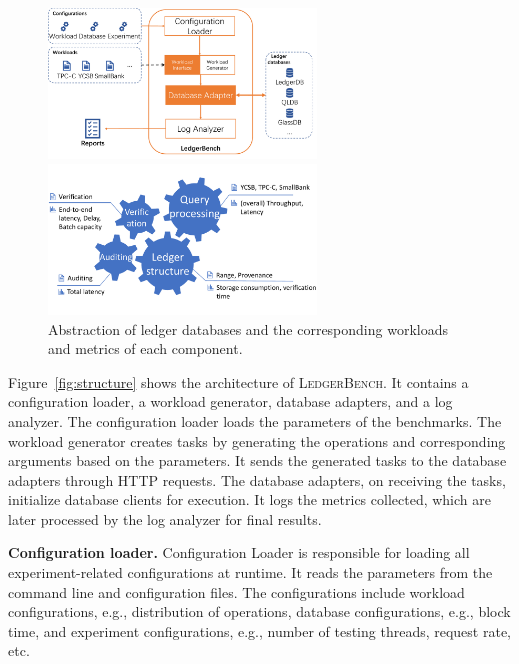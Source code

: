 \documentclass[11pt,dvipdfm]{article}
\newcommand{\systemname}{\textsc{LedgerBench}\xspace}
\begin{document}
\begin{figure}
    \centering
    \begin{minipage}{0.48\textwidth}
        \centering
        \includegraphics[height=4cm]{figs/arch_ledgerbench_fullsize.pdf}
        \caption{\systemname architecture}
        \label{fig:structure}
    \end{minipage}
    \begin{minipage}{0.48\textwidth}
        \centering
        \includegraphics[height=4cm]{figs/abstraction-fullsize.pdf}
        \caption{Abstraction of ledger databases and the corresponding workloads and metrics of each component.}
        \label{fig:abstraction}
    \end{minipage}
\end{figure}

Figure~\ref{fig:structure} shows the architecture of \systemname. It contains a configuration loader, a workload generator, database adapters, and a log analyzer. 
The configuration loader loads the parameters of the benchmarks. The workload generator creates tasks by generating the operations and corresponding arguments based on the parameters. 
It sends the generated tasks to the database adapters through HTTP requests. The database adapters, on receiving the tasks, initialize database clients for execution. It logs the metrics collected, which are later processed by the log analyzer for final results.



\textbf{Configuration loader.} Configuration Loader is responsible for loading all experiment-related configurations at runtime. It reads the parameters from the command line and configuration files. The configurations include workload configurations, e.g., distribution of operations, database configurations, e.g., block time, and experiment configurations, e.g., number of testing threads, request rate, etc.
\end{document}
